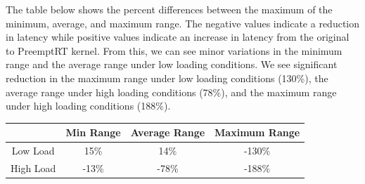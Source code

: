 \documentclass[a4paper,10pt]{article}
\begin{document}
The table below shows the percent differences between the maximum of the minimum, average, and maximum range. The negative values indicate a reduction in latency while positive values indicate an increase in latency from the original to PreemptRT kernel. From this, we can see minor variations in the minimum range and the average range under low loading conditions. We see significant reduction in the maximum range under low loading conditions (130\%), the average range under high loading conditions (78\%), and the maximum range under high loading conditions (188\%). 

\begin{center}
\begin{tabular}{||c c c c||} 
 \hline
  & Min Range & Average Range & Maximum Range \\ [0.5ex] 
 \hline\hline
 Low Load & 15\% & 14\% & -130\% \\ 
 \hline
 High Load & -13\% & -78\% & -188\% \\ [1ex] 
 \hline
\end{tabular}
\end{center}
\end{document}
